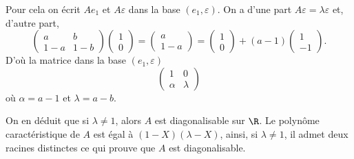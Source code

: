 {\begin{enumerate}
{Pour cela on \'ecrit $Ae_1$ et $A\varepsilon$ dans la base $(e_1,\varepsilon)$. 
On a d'une part $A\varepsilon=\lambda\varepsilon$ et, d'autre part,
$$\begin{pmatrix}a&b \\ 1-a&1-b\end{pmatrix}\begin{pmatrix}1 \\  0\end{pmatrix}=\begin{pmatrix}a \\  1-a\end{pmatrix}
=\begin{pmatrix}1 \\  0\end{pmatrix}+(a-1)\begin{pmatrix}1 \\  -1\end{pmatrix}.$$ 
D'o\`u la matrice dans la base $(e_1,\varepsilon)$
$$\begin{pmatrix}1&0 \\  \alpha&\lambda\end{pmatrix}$$
o\`u $\alpha=a-1$ et $\lambda=a-b$.

On en d\'eduit que si $\lambda\neq 1$, alors $A$ est diagonalisable sur $\R$.
Le polyn\^ome caract\'eristique de $A$ est \'egal \`a $(1-X)(\lambda-X)$, ainsi, si $\lambda\neq 1$, il admet deux racines distinctes ce qui prouve que $A$ est diagonalisable.}
\end{enumerate}
}
